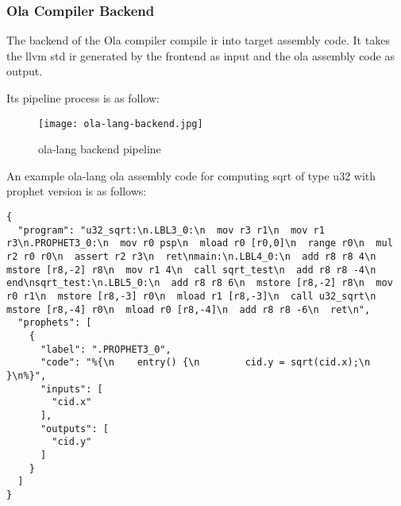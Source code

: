 \subsubsection{Ola Compiler Backend}

The backend of the Ola compiler compile ir into target assembly code. It takes the llvm std ir generated by the frontend as input and the  ola assembly code as output.

Its pipeline process is as follow:
\begin{figure}[!htbp]
    \centering
    \texttt{[image: ola-lang-backend.jpg]}
    \caption{ola-lang backend pipeline}
    \label{fig:ola-lang-backend}
\end{figure}

An example ola-lang ola assembly code for computing sqrt of type u32 with prophet version is as follows:
\begin{lstlisting}[language={}]
{
  "program": "u32_sqrt:\n.LBL3_0:\n  mov r3 r1\n  mov r1 r3\n.PROPHET3_0:\n  mov r0 psp\n  mload r0 [r0,0]\n  range r0\n  mul r2 r0 r0\n  assert r2 r3\n  ret\nmain:\n.LBL4_0:\n  add r8 r8 4\n  mstore [r8,-2] r8\n  mov r1 4\n  call sqrt_test\n  add r8 r8 -4\n  end\nsqrt_test:\n.LBL5_0:\n  add r8 r8 6\n  mstore [r8,-2] r8\n  mov r0 r1\n  mstore [r8,-3] r0\n  mload r1 [r8,-3]\n  call u32_sqrt\n  mstore [r8,-4] r0\n  mload r0 [r8,-4]\n  add r8 r8 -6\n  ret\n",
  "prophets": [
    {
      "label": ".PROPHET3_0",
      "code": "%{\n    entry() {\n        cid.y = sqrt(cid.x);\n    }\n%}",
      "inputs": [
        "cid.x"
      ],
      "outputs": [
        "cid.y"
      ]
    }
  ]
}
\end{lstlisting}

